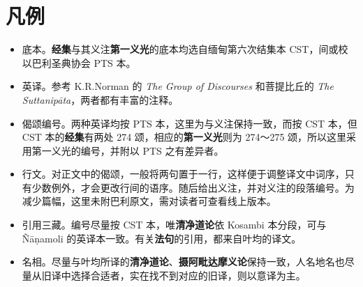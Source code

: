 \chapter{凡例}

\begin{itemize}
    \item 底本。\textbf{经集}与其义注\textbf{第一义光}的底本均选自缅甸第六次结集本 CST，间或校以巴利圣典协会 PTS 本。
    \item 英译。参考 K.R.Norman 的 \textit{The Group of Discourses} 和菩提比丘的 \textit{The Suttanipāta}，两者都有丰富的注释。
    \item 偈颂编号。两种英译均按 PTS 本，这里为与义注保持一致，而按 CST 本，但 CST 本的\textbf{经集}有两处 274 颂，相应的\textbf{第一义光}则为 274～275 颂，所以这里采用第一义光的编号，并附以 PTS 之有差异者。
    \item 行文。对正文中的偈颂，一般将两句置于一行，这样便于调整译文中词序，只有少数例外，才会更改行间的语序。随后给出义注，并对义注的段落编号。为减少篇幅，这里未附巴利原文，需对读者可查看线上版本。
    \item 引用三藏。编号尽量按 CST 本，唯\textbf{清净道论}依 Kosambi 本分段，可与 Ñāṇamoli 的英译本一致。有关\textbf{法句}的引用，都来自叶均的译文。
    \item 名相。尽量与叶均所译的\textbf{清净道论}、\textbf{摄阿毗达摩义论}保持一致，人名地名也尽量从旧译中选择合适者，实在找不到对应的旧译，则以意译为主。
\end{itemize}